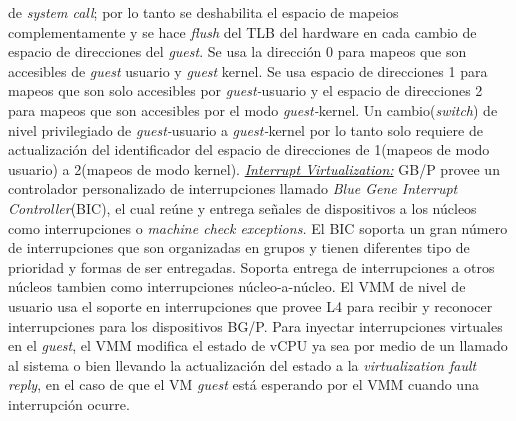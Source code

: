 de \emph{system call}; por lo tanto se deshabilita el espacio de mapeios complementamente y se hace \emph{flush} del TLB del hardware en cada cambio de espacio de direcciones del \emph{guest}. Se usa la dirección 0 para mapeos que son accesibles de \emph{guest} usuario y \emph{guest} kernel. Se usa espacio de direcciones 1 para mapeos que son solo accesibles por \emph{guest-}usuario y el espacio de direcciones 2 para mapeos que son accesibles por el modo \emph{guest-}kernel. Un cambio(\emph{switch}) de nivel privilegiado de \emph{guest-}usuario a \emph{guest-}kernel por lo tanto solo requiere de actualización del identificador del espacio de direcciones de 1(mapeos de modo usuario) a 2(mapeos de modo kernel). \underline{\emph{Interrupt Virtualization:}} GB/P provee un controlador personalizado de interrupciones llamado \emph{Blue Gene Interrupt Controller}(BIC), el cual reúne y entrega señales de dispositivos a los núcleos como interrupciones o \emph{machine check exceptions.} El BIC soporta un gran número de interrupciones que son organizadas en grupos y tienen diferentes tipo de prioridad y formas de ser entregadas. Soporta entrega de interrupciones a otros núcleos tambien como interrupciones núcleo-a-núcleo. El VMM de nivel de usuario usa el soporte en interrupciones que provee L4 para recibir y reconocer interrupciones para los dispositivos BG/P. Para inyectar interrupciones virtuales en el \emph{guest}, el VMM modifica el estado de vCPU ya sea por medio de un llamado al sistema o bien llevando la actualización del estado a la \emph{virtualization fault reply}, en el caso de que el VM \emph{guest} está esperando por el VMM cuando una interrupción ocurre.

